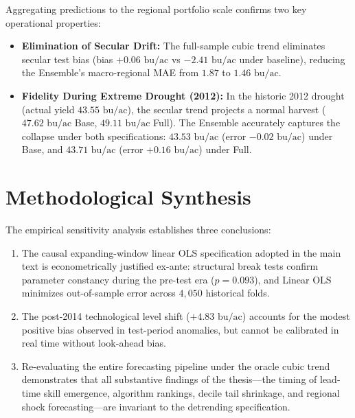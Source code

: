 Aggregating predictions to the regional portfolio scale confirms two key operational properties:
\begin{itemize}
    \item \textbf{Elimination of Secular Drift:} The full-sample cubic trend eliminates secular test bias (bias $+0.06\text{ bu/ac}$ vs $-2.41\text{ bu/ac}$ under baseline), reducing the Ensemble's macro-regional MAE from $1.87$ to $\boldsymbol{1.46}\text{ bu/ac}$.
    \item \textbf{Fidelity During Extreme Drought (2012):} In the historic 2012 drought (actual yield $43.55\text{ bu/ac}$), the secular trend projects a normal harvest ($47.62\text{ bu/ac}$ Base, $49.11\text{ bu/ac}$ Full). The Ensemble accurately captures the collapse under both specifications: $\boldsymbol{43.53}\text{ bu/ac}$ (error $-0.02\text{ bu/ac}$) under Base, and $\boldsymbol{43.71}\text{ bu/ac}$ (error $+0.16\text{ bu/ac}$) under Full.
\end{itemize}


\section{Methodological Synthesis}
\label{sec:app_synthesis}

The empirical sensitivity analysis establishes three conclusions:
\begin{enumerate}
    \item The causal expanding-window linear OLS specification adopted in the main text is econometrically justified ex-ante: structural break tests confirm parameter constancy during the pre-test era ($p = 0.093$), and Linear OLS minimizes out-of-sample error across $4{,}050$ historical folds.
    \item The post-2014 technological level shift ($+4.83\text{ bu/ac}$) accounts for the modest positive bias observed in test-period anomalies, but cannot be calibrated in real time without look-ahead bias.
    \item Re-evaluating the entire forecasting pipeline under the oracle cubic trend demonstrates that all substantive findings of the thesis---the timing of lead-time skill emergence, algorithm rankings, decile tail shrinkage, and regional shock forecasting---are invariant to the detrending specification.
\end{enumerate}
